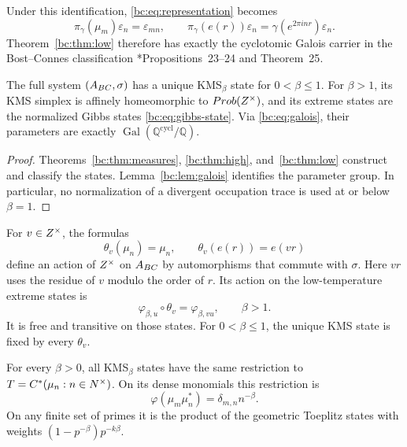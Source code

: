 Under this identification, \eqref{bc:eq:representation} becomes
\[
 \pi_\gamma(\mu_m)\varepsilon_n=\varepsilon_{mn},\qquad
 \pi_\gamma(e(r))\varepsilon_n
      =\gamma(e^{2\pi i nr})\varepsilon_n.
\]
Theorem~\ref{bc:thm:low} therefore has exactly the cyclotomic Galois
carrier in the Bost--Connes classification
\cite{BostConnes1995}*{Propositions~23--24 and Theorem~25}.

\begin{theorem}
\label{thm:bc}
The full system \((A_{BC},\sigma)\) has a unique KMS\(_\beta\) state for
\(0<\beta\leq1\). For \(\beta>1\), its KMS simplex is affinely
homeomorphic to \(Prob(Z^{\times})\), and its extreme states are the
normalized Gibbs states \eqref{bc:eq:gibbs-state}.
Via \eqref{bc:eq:galois}, their parameters are exactly
\(\operatorname{Gal}(\mathbb Q^{\mathrm{cycl}}/\mathbb Q)\).
\end{theorem}

\begin{proof}
Theorems~\ref{bc:thm:measures}, \ref{bc:thm:high}, and~\ref{bc:thm:low}
construct and classify the states. Lemma~\ref{bc:lem:galois} identifies
the parameter group. In particular, no normalization of a divergent
occupation trace is used at or below \(\beta=1\).
\end{proof}

\begin{proposition}\label{bc:prop:symmetry}
For \(v\in Z^{\times}\), the formulas
\[
 \theta_v(\mu_n)=\mu_n,\qquad \theta_v(e(r))=e(vr)
\]
define an action of \(Z^{\times}\) on \(A_{BC}\) by automorphisms that commute
with \(\sigma\). Here \(vr\) uses the residue of \(v\) modulo the
order of \(r\). Its action on the low-temperature extreme states is
\begin{equation}\label{bc:eq:symmetry}
 \varphi_{\beta,u}\circ\theta_v=\varphi_{\beta,vu},
 \qquad \beta>1.
\end{equation}
It is free and transitive on those states. For \(0<\beta\leq1\),
the unique KMS state is fixed by every \(\theta_v\).

For every \(\beta>0\), all KMS\(_\beta\) states have the same
restriction to \(T=C^*(\mu_n:n\in N^{\times})\). On its dense
monomials this restriction is
\begin{equation}\label{bc:eq:toeplitz}
 \varphi(\mu_m\mu_n^*)=\delta_{m,n}n^{-\beta}.
\end{equation}
On any finite set of primes it is the product of the geometric
Toeplitz states with weights \((1-p^{-\beta})p^{-k\beta}\).
\end{proposition}

